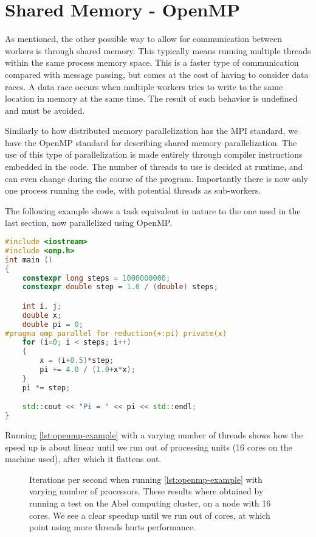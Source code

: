 \documentclass[Thesis.tex]{subfiles}
\begin{document}
\section{Shared Memory - OpenMP}

As mentioned, the other possible way to allow for communication between workers
is through shared memory. This typically means running multiple threads within
the same process memory space. This is a faster type of communication compared
with message passing, but comes at the cost of having to consider data races. A
data race occurs when multiple workers tries to write to the same location in
memory at the same time. The result of such behavior is undefined and must be
avoided.

Similarly to how distributed memory parallelization has the MPI standard, we
have the OpenMP standard for describing shared memory parallelization. The use
of this type of parallelization is made entirely through compiler instructions
embedded in the code. The number of threads to use is decided at runtime, and
can even change during the course of the program. Importantly there is now only
one process running the code, with potential threads as sub-workers.

The following example shows a task equivalent in nature to
the one used in the last section, now parallelized using OpenMP.

\begin{center}
\begin{lstlisting}[language=C++, caption={Example of parallel estimation of $\pi$ using OpenMP.}, label={lst:openmp-example}]
#include <iostream>
#include <omp.h>
int main ()
{
    constexpr long steps = 1000000000;
    constexpr double step = 1.0 / (double) steps;

    int i, j;
    double x;
    double pi = 0;
#pragma omp parallel for reduction(+:pi) private(x)
    for (i=0; i < steps; i++)
    {
        x = (i+0.5)*step;
        pi += 4.0 / (1.0+x*x);
    }
    pi *= step;

    std::cout << "Pi = " << pi << std::endl;
}
\end{lstlisting}
\end{center}
Running \cref{lst:openmp-example} with a varying number of threads shows how the
speed up is about linear until we run out of processing units (16 cores on the
machine used), after which it flattens out.

\begin{figure}[h]
  \centering
    \resizebox{0.7\linewidth}{!}{%
        
    }
  \caption{Iterations per second when running \cref{lst:openmp-example} with
    varying number of processors. These results where obtained by running a test
    on the Abel computing cluster, on a node with 16 cores. We see a clear
    speedup until we run out of cores, at which point using more threads hurts
    performance.}
  \label{fig:mpi-example}
\end{figure}
\end{document}
